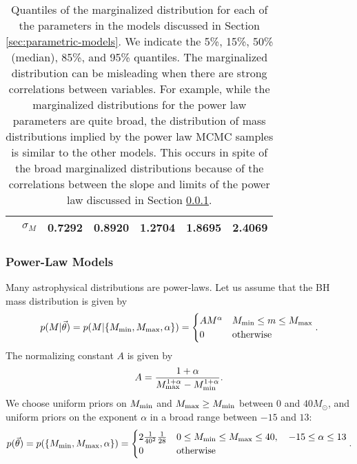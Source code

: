 \documentclass[preprint]{aastex}
\newcommand{\Msun}{M_\odot}
\newcommand{\Mmin}{M_{\textnormal{min}}}
\newcommand{\Mmax}{M_{\textnormal{max}}}
\newcommand{\vtheta}{\vec{\theta}}
\begin{document}
\begin{table}
\begin{center}
\begin{tabular}{|l|c|c|c|c|c|c|}
       \hline 
       & $\sigma_M$ & 0.7292  &  0.8920  & 1.2704  &  1.8695  &  2.4069 \\
       \hline
    \end{tabular}
  \end{center}
  \caption{\label{tab:low-mass-parametric} Quantiles of the
    marginalized distribution for each of the parameters in the models
    discussed in Section \ref{sec:parametric-models}.  We indicate
    the 5\%, 15\%, 50\% (median), 85\%, and 95\% quantiles.  The
    marginalized distribution can be misleading when there are strong
    correlations between variables.  For example, while the
    marginalized distributions for the power law parameters are quite
    broad, the distribution of mass distributions implied by the power
    law MCMC samples is similar to the other models.  This occurs in
    spite of the broad marginalized distributions because of the
    correlations between the slope and limits of the power law
    discussed in Section \ref{sec:power-law}.}
\end{table}

\subsubsection{Power-Law Models}
\label{sec:power-law}

Many astrophysical distributions are power-laws.  Let us assume that
the BH mass distribution is given by
\begin{equation}
  \label{eq:power-law-dist}
  p(M|\vtheta) = p(M|\{\Mmin, \Mmax, \alpha \}) =
  \begin{cases}
    A M^\alpha & \Mmin \leq m \leq \Mmax \\
    0 & \textnormal{otherwise}
  \end{cases}.
\end{equation}
The normalizing constant $A$ is given by 
\begin{equation}
  A = \frac{1+\alpha}{\Mmax^{1+\alpha} - \Mmin^{1+\alpha}}.
\end{equation}
We choose uniform priors on $\Mmin$ and $\Mmax \geq \Mmin$ between 0 and
$40 \Msun$, and uniform priors on the exponent $\alpha$ in a broad
range between $-15$ and $13$:
\begin{equation}
  p(\vtheta) = p(\{\Mmin, \Mmax, \alpha\}) = 
  \begin{cases}
    2 \frac{1}{40^2}\frac{1}{28} & 0 \leq \Mmin \leq \Mmax
    \leq 40, \quad -15 \leq \alpha \leq 13 \\
    0 & \textnormal{otherwise}
  \end{cases}.
\end{equation}
\end{document}
